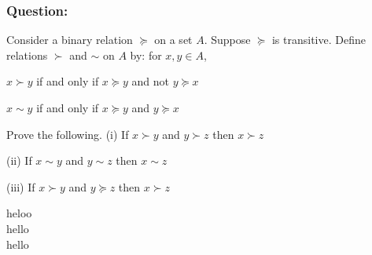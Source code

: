 \documentclass[12pt,a4paper]{article}
\begin{document}
  \subsubsection*{Question:} Consider a binary relation \(\succeq \) on a set \(A\). Suppose \(\succeq \) is transitive. Define relations \(\succ \) and \(\sim \) on \(A\) by: for \(x, y \in A\),

  \(x \succ y\) if and only if \(x \succeq y\) and not \(y \succeq x\)

  \(x \sim y\) if and only if \(x \succeq y\) and \(y \succeq x\)

Prove the following.
(i) If \(x \succ y\) and \(y \succ z\) then \(x \succ z\)

(ii) If \(x \sim y\) and \(y \sim z\) then \(x \sim z\)

(iii) If \(x \succ y\) and \(y \succeq z\) then \(x \succ z\)

\begin{description}
    \item[heloo] 
    \item[hello]
    \item[hello]
    \item[]   
\end{description}
\end{document}
